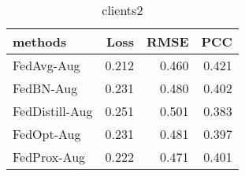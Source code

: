 \begin{table}
\caption{clients2}
\begin{tabular}{lrrr}
\toprule
methods & Loss & RMSE & PCC \\
\midrule
FedAvg-Aug & 0.212 & 0.460 & 0.421 \\
FedBN-Aug & 0.231 & 0.480 & 0.402 \\
FedDistill-Aug & 0.251 & 0.501 & 0.383 \\
FedOpt-Aug & 0.231 & 0.481 & 0.397 \\
FedProx-Aug & 0.222 & 0.471 & 0.401 \\
\bottomrule
\end{tabular}
\end{table}
